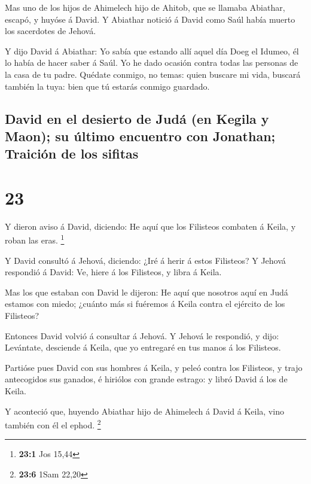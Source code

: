  Mas uno de los hijos de Ahimelech hijo de Ahitob, que se
llamaba Abiathar, escapó, y huyóse á David.  Y Abiathar
notició á David como Saúl había muerto los sacerdotes de Jehová.

 Y dijo David á Abiathar: Yo sabía que estando allí aquel
día Doeg el Idumeo, él lo había de hacer saber á Saúl. Yo he dado
ocasión contra todas las personas de la casa de tu padre. 
Quédate conmigo, no temas: quien buscare mi vida, buscará también la
tuya: bien que tú estarás conmigo guardado.

\hypertarget{david-en-el-desierto-de-juduxe1-en-kegila-y-maon-su-uxfaltimo-encuentro-con-jonathan-traiciuxf3n-de-los-sifitas}{%
\subsection{David en el desierto de Judá (en Kegila y Maon); su último
encuentro con Jonathan; Traición de los
sifitas}\label{david-en-el-desierto-de-juduxe1-en-kegila-y-maon-su-uxfaltimo-encuentro-con-jonathan-traiciuxf3n-de-los-sifitas}}

\hypertarget{section-22}{%
\section{23}\label{section-22}}

 Y dieron aviso á David, diciendo: He aquí que los Filisteos
combaten á Keila, y roban las eras. \footnote{\textbf{23:1} Jos 15,44}

 Y David consultó á Jehová, diciendo: ¿Iré á herir á estos
Filisteos? Y Jehová respondió á David: Ve, hiere á los Filisteos, y
libra á Keila.

 Mas los que estaban con David le dijeron: He aquí que
nosotros aquí en Judá estamos con miedo; ¿cuánto más si fuéremos á Keila
contra el ejército de los Filisteos?

 Entonces David volvió á consultar á Jehová. Y Jehová le
respondió, y dijo: Levántate, desciende á Keila, que yo entregaré en tus
manos á los Filisteos.

 Partióse pues David con sus hombres á Keila, y peleó contra
los Filisteos, y trajo antecogidos sus ganados, é hiriólos con grande
estrago: y libró David á los de Keila.

 Y aconteció que, huyendo Abiathar hijo de Ahimelech á David
á Keila, vino también con él el ephod. \footnote{\textbf{23:6} 1Sam
  22,20}

